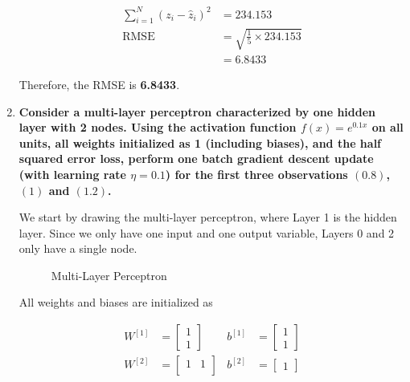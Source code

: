 \documentclass[12pt]{article}
\begin{document}
\begin{enumerate}[leftmargin=\labelsep]
          $$
              \begin{aligned}
                  \sum_{i = 1}^{N} (z_i - \hat{z}_i)^2 & = 234.153                           \\
                  \text{RMSE}                          & = \sqrt{\frac{1}{5} \times 234.153} \\
                                                       & = 6.8433
              \end{aligned}
          $$

          Therefore, the RMSE is \textbf{6.8433}.

    \item {\color{questioncolor}\bfseries
          Consider a multi-layer perceptron characterized by one hidden layer with 2 nodes.
          Using the activation function $f(x) = e^{0.1 x}$ on all units, all weights
          initialized as 1 (including biases), and the half squared error loss,
          perform one batch gradient descent update (with learning rate $\eta = 0.1$)
          for the first three observations $(0.8)$, $(1)$ and $(1.2)$.
          }\\
          \vspace{0.5em}

          We start by drawing the multi-layer perceptron, where Layer 1 is the hidden layer.
          Since we only have one input and one output variable, Layers 0 and 2 only
          have a single node.

          \begin{figure}[H]
              \centering
              
              \caption{Multi-Layer Perceptron}
              \label{fig:multi-layer-perceptron}
          \end{figure}

          All weights and biases are initialized as

          $$
              \begin{aligned}
                  W^{[1]} & = \begin{bmatrix}
                                  1 \\
                                  1
                              \end{bmatrix} &
                  b^{[1]} & = \begin{bmatrix}
                                  1 \\
                                  1
                              \end{bmatrix}  \\
                  W^{[2]} & = \begin{bmatrix}
                                  1 & 1 \\
                              \end{bmatrix} &
                  b^{[2]} & = \begin{bmatrix}
                                  1
                              \end{bmatrix}
              \end{aligned}
          $$


\end{enumerate}
\end{document}
